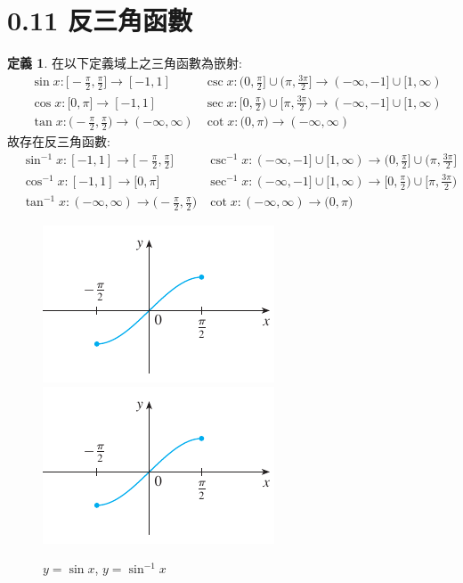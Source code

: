 \documentclass[12pt]{extarticle}
\theoremstyle{definition}
\newtheorem*{dfn}{定義}
\begin{document}
\section*{0.11 反三角函數}

\begin{dfn}
  在以下定義域上之三角函數為嵌射: 
  \begin{align*}
    &\sin x: \big[-\frac{\pi}{2}, \frac{\pi}{2}\big]\to[-1, 1] &\csc x: \big(0, \frac{\pi}{2}\big]\cup\big(\pi, \frac{3\pi}{2}\big]\to(-\infty, -1]\cup[1,\infty) \\
    &\cos x: \big[0, \pi\big]\to[-1, 1] &\sec x: \big[0, \frac{\pi}{2}\big)\cup\big[\pi, \frac{3\pi}{2}\big)\to(-\infty, -1]\cup[1,\infty) \\
    &\tan x: \big(-\frac{\pi}{2}, \frac{\pi}{2}\big)\to(-\infty, \infty) &\cot x: \big(0, \pi\big)\to(-\infty, \infty)\qquad\qquad
  \end{align*}
  故存在反三角函數: 
  \begin{align*}
   &\sin^{-1} x: [-1, 1]\to\big[-\frac{\pi}{2}, \frac{\pi}{2}\big] &\csc^{-1} x: (-\infty, -1]\cup[1,\infty)\to\big(0, \frac{\pi}{2}\big]\cup\big(\pi, \frac{3\pi}{2}\big] \\
   &\cos^{-1} x: [-1, 1]\to\big[0, \pi\big] &\sec^{-1} x: (-\infty, -1]\cup[1,\infty)\to\big[0, \frac{\pi}{2}\big)\cup\big[\pi, \frac{3\pi}{2}\big) \\
   &\tan^{-1} x: (-\infty, \infty)\to\big(-\frac{\pi}{2}, \frac{\pi}{2}\big) &\cot x: (-\infty, \infty)\to\big(0, \pi\big)\qquad\qquad
 \end{align*}
\end{dfn}

\vspace{-1cm}
\begin{figure}[!htbp]
  \centering
  \includegraphics[height=.25\textheight,page=1]{fig/trig.pdf}\hspace{2cm}
  \includegraphics[height=.25\textheight,page=2]{fig/trig.pdf}
  \caption{$y = \sin x$, $y = \sin^{-1} x$}
\end{figure}
\end{document}
